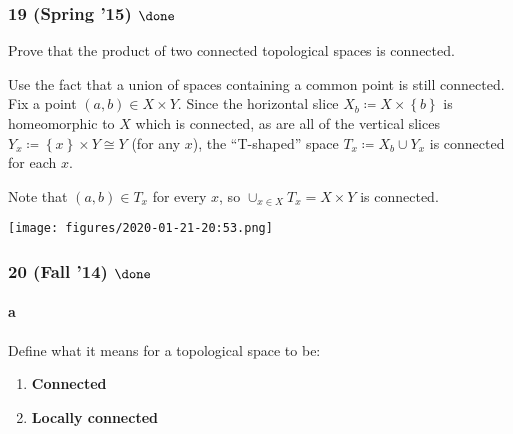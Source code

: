 \hypertarget{spring-15-done-2}{%
\subsubsection{\texorpdfstring{19 (Spring '15)
\(\done\)}{19 (Spring '15) \textbackslash done}}\label{spring-15-done-2}}

Prove that the product of two connected topological spaces is connected.

\begin{solution}

\hfill

\begin{concept}

\hfill

\end{concept}

Use the fact that a union of spaces containing a common point is still
connected. Fix a point \((a, b) \in X \times Y\). Since the horizontal
slice \(X_b\coloneqq X \times\left\{{b}\right\}\) is homeomorphic to
\(X\) which is connected, as are all of the vertical slices
\(Y_x \coloneqq\left\{{x}\right\} \times Y \cong Y\) (for any \(x\)),
the ``T-shaped'' space \(T_x \coloneqq X_b \cup Y_x\) is connected for
each \(x\).

Note that \((a, b) \in T_x\) for every \(x\), so
\(\cup_{x\in X} T_x = X \times Y\) is connected.

\texttt{[image: figures/2020-01-21-20:53.png]}\\

\end{solution}

\hypertarget{fall-14-done}{%
\subsubsection{\texorpdfstring{20 (Fall '14)
\(\done\)}{20 (Fall '14) \textbackslash done}}\label{fall-14-done}}

\hypertarget{a-2}{%
\paragraph{a}\label{a-2}}

Define what it means for a topological space to be:

\begin{enumerate}
\def\labelenumi{\roman{enumi}.}
\item
  \textbf{Connected}
\item
  \textbf{Locally connected}
\end{enumerate}

